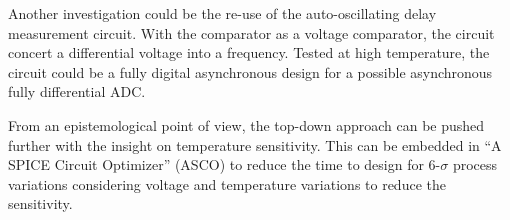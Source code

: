 Another investigation could be the re-use of the auto-oscillating delay measurement circuit. With the comparator as a voltage comparator, the circuit concert a differential voltage into a frequency. Tested at high temperature, the circuit could be a fully digital asynchronous design for a possible asynchronous fully differential ADC\@.

From an epistemological point of view, the top-down approach can be pushed further with the insight on temperature sensitivity. This can be embedded in ``A SPICE Circuit Optimizer'' (ASCO) to reduce the time to design for 6-$\sigma$ process variations considering voltage and temperature variations to reduce the sensitivity.
